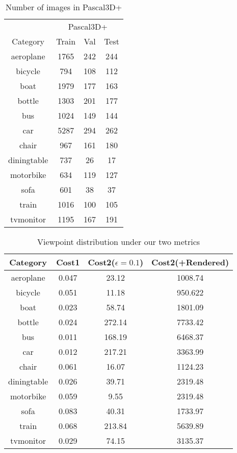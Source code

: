 \documentclass[10pt,twocolumn,letterpaper]{article}
\begin{document}
	\begin{table}[h]
		\centering
		\begin{tabular}{|c|ccc|}
			\hline
			& \multicolumn{3}{|c|}{Pascal3D+} \\
			Category & Train & Val & Test \\
			\hline
			aeroplane & 1765 & 242 & 244 \\ 
			bicycle & 794 & 108 & 112 \\ 
			boat & 1979 & 177 & 163 \\ 
			bottle & 1303 & 201 & 177 \\ 
			bus & 1024 & 149 & 144 \\ 
			car & 5287 & 294 & 262 \\ 
			chair & 967 & 161 & 180 \\ 
			diningtable & 737 & 26 & 17 \\ 
			motorbike & 634 & 119 & 127 \\ 
			sofa & 601 & 38 & 37 \\ 
			train & 1016 & 100 & 105 \\ 
			tvmonitor & 1195 & 167 & 191 \\ 
			\hline
		\end{tabular}
		\caption{Number of images in Pascal3D+}
		\label{table:num_images}
	\end{table}
	
	\begin{table}[h]
		\centering
		\begin{tabular}{|c|@{\;}c@{\;}c@{\;}|@{\;}c@{\;}|}
			\hline
			Category & Cost1 & Cost2($\epsilon = 0.1$) & Cost2(+Rendered)\\
			\hline
			aeroplane & 0.047 & 23.12 & 1008.74\\ 
			bicycle & 0.051 & 11.18 & 950.622\\ 
			boat & 0.023 & 58.74 & 1801.09 \\ 
			bottle & 0.024 & 272.14 & 7733.42 \\ 
			bus & 0.011 & 168.19 & 6468.37 \\ 
			car & 0.012 & 217.21 & 3363.99 \\ 
			chair & 0.061 & 16.07 & 1124.23 \\ 
			diningtable & 0.026 & 39.71 & 2319.48 \\ 
			motorbike & 0.059 & 9.55 & 2319.48 \\ 
			sofa & 0.083 & 40.31 & 1733.97 \\ 
			train & 0.068 & 213.84 & 5639.89 \\ 
			tvmonitor & 0.029 & 74.15 & 3135.37 \\
			\hline
		\end{tabular}
		\caption{Viewpoint distribution under our two metrics}
		\label{table:viewpoint_dist}
	\end{table}
\end{document}
